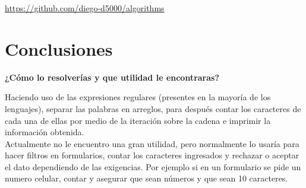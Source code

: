 \documentclass[spanish,12pt,letterpapper]{article}
\begin{document}
	\url{https://github.com/diego-d5000/algorithms}
	
	\section{Conclusiones \\}
	\textbf{¿Cómo lo resolverías y que utilidad le encontraras?\\}
	
	Haciendo uso de las expresiones regulares (presentes en la mayoría de los lenguajes), separar las palabras en arreglos, para después contar los caracteres de cada una de ellas por medio de la iteración sobre la cadena e imprimir la información obtenida.\\
	
	Actualmente no le encuentro una gran utilidad, pero normalmente lo usaría para hacer filtros en formularios, contar los caracteres ingresados y rechazar o aceptar el dato dependiendo de las exigencias. Por ejemplo si en un formulario se pide un numero celular, contar y asegurar que sean números y que sean 10 caracteres.
	
	\pagebreak
	
\end{document}

